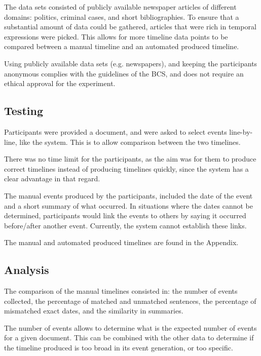 \par The data sets consisted of publicly available newspaper articles of different domains: politics, criminal cases, and short bibliographies. To ensure that a substantial amount of data could be gathered, articles that were rich in temporal expressions were picked. This allows for more timeline data points to be compared between a manual timeline and an automated produced timeline.

\par Using publicly available data sets (e.g. newspapers), and keeping the participants anonymous complies with the guidelines of the BCS, and does not require an ethical approval for the experiment.

\subsection{Testing}
\par Participants were provided a document, and were asked to select events line-by-line, like the system. This is to allow comparison between the two timelines. 

\par There was no time limit for the participants, as the aim was for them to produce correct timelines instead of producing timelines quickly, since the system has a clear advantage in that regard.

\par The manual events produced by the participants, included the date of the event and a short summary of what occurred. In situations where the dates cannot be determined, participants would link the events to others by saying it occurred before/after another event. Currently, the system cannot establish these links.

\par The manual and automated produced timelines are found in the Appendix.

\subsection{Analysis}
\par The comparison of the manual timelines consisted in: the number of events collected, the percentage of matched and unmatched sentences, the percentage of mismatched exact dates, and the similarity in summaries. 

\par The number of events allows to determine what is the expected number of events for a given document. This can be combined with the other data to determine if the timeline produced is too broad in its event generation, or too specific.

